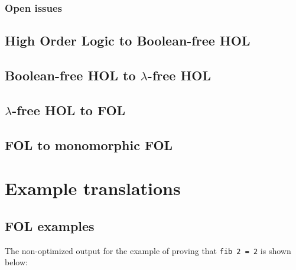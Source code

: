 \documentclass[a4paper]{article}
\begin{document}
\subsubsection{Open issues}
\subsection{High Order Logic to Boolean-free HOL}
\subsection{Boolean-free HOL to $\lambda$-free HOL}
\subsection{$\lambda$-free HOL to FOL}
\subsection{FOL to monomorphic FOL}

\newpage



\appendix
\section{Example translations}
\subsection{FOL examples}
\label{sec:fol_examples}
The non-optimized output for the example of proving that \texttt{fib 2 = 2} is shown below:
\end{document}
